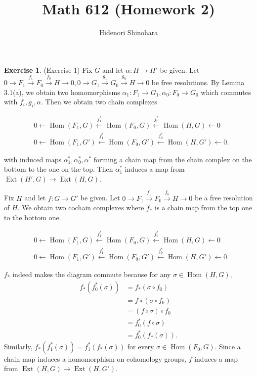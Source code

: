 \documentclass[12pt, psamsfonts]{amsart}
\theoremstyle{definition}
\newtheorem*{exer}{Exercise}
\theoremstyle{remark}
\DeclareMathOperator{\Hom}{Hom}
\DeclareMathOperator{\Ext}{Ext}
\DeclareMathOperator{\Hom}{Hom}
\numberwithin{equation}{section}
\begin{document}
\title{Math 612 (Homework 2)}
\author{Hidenori Shinohara}
\maketitle

\begin{exer}{(Exercise 1)}
  Fix $G$ and let $\alpha: H \rightarrow H'$ be given.
  Let $0 \rightarrow F_1 \xrightarrow{f_1} F_0 \xrightarrow{f_0} H \rightarrow 0, 0 \rightarrow G_1 \xrightarrow{g_1} G_0 \xrightarrow{g_0} H \rightarrow 0$ be free resolutions.
  By Lemma 3.1(a), we obtain two homomorphisms $\alpha_1: F_1 \rightarrow G_1, \alpha_0: F_0 \rightarrow G_0$ which commutes with $f_i, g_i, \alpha$.
  Then we obtain two chain complexes

  \begin{align*}
    &0 \leftarrow \Hom(F_1, G) \xleftarrow{f_1^{\ast}} \Hom(F_0, G) \xleftarrow{f_0^{\ast}} \Hom(H, G) \leftarrow 0 \\
    &0 \leftarrow \Hom(F_1, G') \xleftarrow{f_1^{\ast}} \Hom(F_0, G') \xleftarrow{f_0^{\ast}} \Hom(H, G') \leftarrow 0.
  \end{align*}

  with induced maps $\alpha_1^{\ast}, \alpha_0^{\ast}, \alpha^{\ast}$ forming a chain map from the chain complex on the bottom to the one on the top.
  Then $\alpha_1^{\ast}$ induces a map from $\Ext(H', G) \rightarrow \Ext(H, G)$.

  Fix $H$ and let $f: G \rightarrow G'$ be given.
  Let $0 \rightarrow F_1 \xrightarrow{f_1} F_0 \xrightarrow{f_0} H \rightarrow 0$ be a free resolution of $H$.
  We obtain two cochain complexes where $f_{\ast}$ is a chain map from the top one to the bottom one.

  \begin{align*}
    &0 \leftarrow \Hom(F_1, G) \xleftarrow{f_1^{\ast}} \Hom(F_0, G) \xleftarrow{f_0^{\ast}} \Hom(H, G) \leftarrow 0 \\
    &0 \leftarrow \Hom(F_1, G') \xleftarrow{f_1^{\ast}} \Hom(F_0, G') \xleftarrow{f_0^{\ast}} \Hom(H, G') \leftarrow 0.
  \end{align*}

  $f_{\ast}$ indeed makes the diagram commute because for any $\sigma \in \Hom(H, G)$,
  \begin{align*} 
    f_{\ast}(f_0^{\ast}(\sigma))
      &= f_{\ast}(\sigma \circ f_0) \\
      &= f \circ (\sigma \circ f_0) \\
      &= (f \circ \sigma) \circ f_0 \\
      &= f_0^{\ast}(f \circ \sigma) \\
      &= f_0^{\ast}(f_{\ast}(\sigma)).
  \end{align*}
  Similarly, $f_{\ast}(f_1^{\ast}(\sigma)) = f_1^{\ast}(f_{\ast}(\sigma))$ for every $\sigma \in \Hom(F_0, G)$.
  Since a chain map induces a homomorphism on cohomology groups, $f$ induces a map from $\Ext(H, G) \rightarrow \Ext(H, G')$.
\end{exer}
\end{document}

